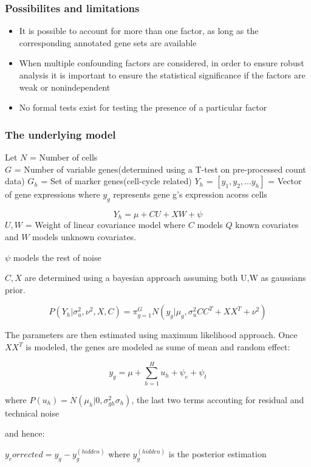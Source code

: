 \documentclass[10pt, compress]{beamer}
\renewcommand{\(}{\begin{columns}}
\renewcommand{\)}{\end{columns}}
\newcommand{\<}[1]{\begin{column}{#1}}
\renewcommand{\>}{\end{column}}
\begin{document}
\begin{frame}
\frametitle{Possibilites and limitations}
\begin{itemize}
\item It is possible to account for more than one factor, as long as the corresponding annotated gene sets are available
\item When multiple confounding factors are considered, in order to ensure robust analysis it is important to ensure
the statistical significance if the factors are weak or nonindependent
\item No formal tests exist for testing the presence of a particular factor

\end{itemize}
\end{frame}


\begin{frame}
\frametitle{The underlying model}
Let $N$ = Number of cells \\
$G$ = Number of variable genes(determined using a T-test on pre-processed count data)
$G_h$ = Set of marker genes(cell-cycle related)
$Y_h$ = $[y_1, y_2, ... y_h]$ = Vector of gene expressions  where $y_g$ represents gene g's expression acorss cells

\begin{equation}
Y_h = \mu + CU + XW + \psi
\end{equation}
$U,W$ = Weight of linear covariance model where $C$ models $Q$ known covariates and $W$ models unknown covariates.

$\psi$ models the rest of noise

$C,X$ are determined using a bayesian approach assuming both U,W as gaussians prior.

\begin{equation}
P(Y_h|\sigma_u^2, \nu^2, X, C) = \pi_{g=1}^{G} N(y_g|\mu_g, {\sigma_u^2CC^T+XX^T+\nu^2} )
\end{equation}

The parameters are then estimated using maximum likelihood approach. Once $XX^T$ is modeled, the genes are modeled
as sume of mean and random effect:

\begin{equation}
y_g = \mu + \sum_{h=1}^Hu_h + \psi_e + \psi_t
\end{equation}

where $P(u_h)=N(\mu_h|0, \sigma_{gh}^2\sigma_h)$, the last two terms accouting for residual and technical noise

and hence:

$y_corrected = y_g - y_g^{(hidden)}$
where $y_g^{(hidden)}$ is the posterior estimation 
\end{frame}
\end{document}
